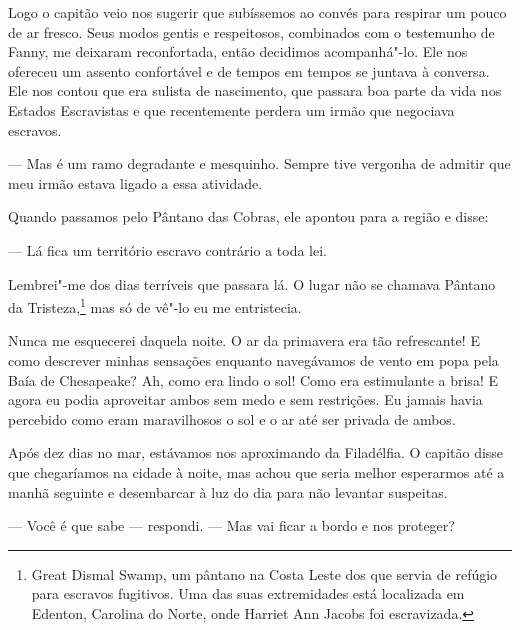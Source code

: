 Logo o capitão veio nos sugerir que
subíssemos ao convés para respirar um pouco de ar fresco. Seus modos
gentis e respeitosos, combinados com o testemunho de Fanny, me deixaram
reconfortada, então decidimos acompanhá"-lo. Ele nos ofereceu um assento
confortável e de tempos em tempos se juntava à conversa. Ele nos contou
que era sulista de nascimento, que passara boa parte da vida nos Estados
Escravistas e que recentemente perdera um irmão que negociava escravos.

--- Mas é um ramo degradante e mesquinho. Sempre tive vergonha de
admitir que meu irmão estava ligado a essa atividade.

Quando passamos pelo Pântano das Cobras, ele apontou para a região e
disse:

--- Lá fica um território escravo contrário a toda lei.

Lembrei"-me dos dias terríveis que passara lá. O lugar não se chamava
Pântano da Tristeza,\footnote{Great Dismal Swamp, um pântano na Costa
  Leste dos  que servia de refúgio para escravos fugitivos. Uma das
  suas extremidades está localizada em Edenton, Carolina do Norte, onde
  Harriet Ann Jacobs foi escravizada.} mas só de vê"-lo eu me
entristecia.

Nunca me esquecerei daquela noite. O ar
da primavera era tão refrescante! E como descrever minhas sensações
enquanto navegávamos de vento em popa pela Baía de Chesapeake? Ah, como
era lindo o sol! Como era estimulante a brisa! E agora eu podia
aproveitar ambos sem medo e sem restrições. Eu jamais havia percebido
como eram maravilhosos o sol e o ar até ser privada de ambos.

Após dez dias no mar, estávamos nos
aproximando da Filadélfia. O capitão disse que chegaríamos na cidade à
noite, mas achou que seria melhor esperarmos até a manhã seguinte e
desembarcar à luz do dia para não levantar suspeitas.

--- Você é que sabe --- respondi. ---
Mas vai ficar a bordo e nos proteger?

